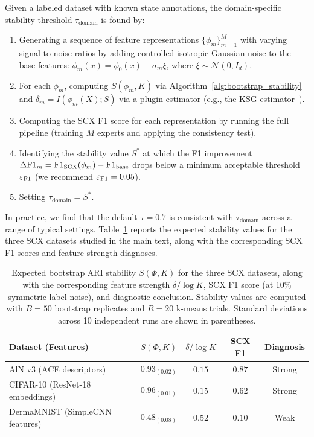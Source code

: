 \begin{definition}
\label{def:calibration}
Given a labeled dataset with known state annotations, the domain-specific stability threshold $\tau_{\text{domain}}$ is found by:
\begin{enumerate}
    \item Generating a sequence of feature representations $\{\phi_m\}_{m=1}^M$ with varying signal-to-noise ratios by adding controlled isotropic Gaussian noise to the base features: $\phi_m(x) = \phi_0(x) + \sigma_m \xi$, where $\xi \sim \mathcal{N}(0, I_d)$.
    \item For each $\phi_m$, computing $S(\phi_m, K)$ via Algorithm~\ref{alg:bootstrap_stability} and $\delta_m = I(\phi_m(X); S)$ via a plugin estimator (e.g., the KSG estimator~\cite{kraskov2004estimating}).
    \item Computing the SCX F1 score for each representation by running the full pipeline (training $M$ experts and applying the consistency test).
    \item Identifying the stability value $S^*$ at which the F1 improvement $\Delta\mathrm{F1}_m = \mathrm{F1}_{\mathrm{SCX}}(\phi_m) - \mathrm{F1}_{\mathrm{base}}$ drops below a minimum acceptable threshold $\varepsilon_{\mathrm{F1}}$ (we recommend $\varepsilon_{\mathrm{F1}} = 0.05$).
    \item Setting $\tau_{\text{domain}} = S^*$.
\end{enumerate}
\end{definition}

In practice, we find that the default $\tau = 0.7$ is consistent with $\tau_{\text{domain}}$ across a range of typical settings. Table~\ref{tab:expected_stabilities} reports the expected stability values for the three SCX datasets studied in the main text, along with the corresponding SCX F1 scores and feature-strength diagnoses.

\begin{table}[t]
\caption{Expected bootstrap ARI stability $S(\Phi, K)$ for the three SCX datasets, along with the corresponding feature strength $\delta / \log K$, SCX F1 score (at 10\% symmetric label noise), and diagnostic conclusion. Stability values are computed with $B = 50$ bootstrap replicates and $R = 20$ k-means trials. Standard deviations across 10 independent runs are shown in parentheses.}
\label{tab:expected_stabilities}
\begin{tabular}{lcccc}
\toprule
Dataset (Features) & $S(\Phi, K)$ & $\delta / \log K$ & SCX F1 & Diagnosis \\
\midrule
AlN v3 (ACE descriptors) & $0.93_{(0.02)}$ & $0.15$ & $0.87$ & Strong \\
CIFAR-10 (ResNet-18 embeddings) & $0.96_{(0.01)}$ & $0.15$ & $0.62$ & Strong \\
DermaMNIST (SimpleCNN features) & $0.48_{(0.08)}$ & $0.52$ & $0.10$ & Weak \\
\bottomrule
\end{tabular}
\end{table}

